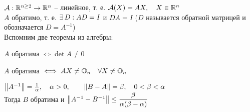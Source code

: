 \begin{theorem}
	$ \mathcal{A} : \mathbb{R}^{n \ge 2} \to \mathbb{R}^n $ -- линейное, т. е. $ \mathcal{A}(X) = AX, \quad X \in \mathbb{R}^n $ \\
	$ A $ обратимо, т. е. $ \exists\, D : AD = I $ и $ DA = I $ ($ D $ называется обратной матрицей и обозначается $ D = A^{-1} $) \\
	Вспомним две теоремы из алгебры:
	\begin{remind}
		$ A $ обратима $ \iff \det A \ne 0 $
	\end{remind}
	\begin{remind}
		$ A $ обратима $ \iff AX \ne \mathbb{O}_{n} \quad \forall X \ne \mathbb{O}_{n} $
	\end{remind}
	$ \left\|{A^{-1}}\right\| = \frac1\alpha, \quad \alpha > 0, \qquad \left\|{B - A}\right\| = \beta, \quad 0 < \beta < \alpha $ \\
	Тогда $ B $ обратима и $ \left\|{A^{-1} - B^{-1}}\right\| \le \dfrac{\beta}{\alpha(\beta - \alpha)} $
\end{theorem}

